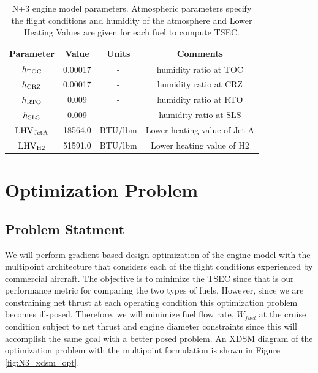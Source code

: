 \documentclass[conf]{new-aiaa}
\begin{document}
\begin{table}[hbt!]
    \centering
    \caption{
        N+3 engine model parameters.
        Atmospheric parameters specify the flight conditions and humidity of the atmosphere and Lower Heating Values are given for each fuel to compute TSEC.}
    \begin{tabular}{c c c c}
        \hline
        Parameter              & Value   & Units          & Comments                                        \\
        \hline
        $h_{\rm{TOC}}$         & 0.00017 & -              & humidity ratio at TOC \cite{Kalnay1996}         \\
        $h_{\rm{CRZ}}$         & 0.00017 & -              & humidity ratio at CRZ \cite{Kalnay1996}         \\
        $h_{\rm{RTO}}$         & 0.009   & -              & humidity ratio at RTO \cite{Kalnay1996}         \\
        $h_{\rm{SLS}}$         & 0.009   & -              & humidity ratio at SLS \cite{Kalnay1996}         \\
        $\rm{LHV}_{\rm{JetA}}$ & 18564.0 & \unit{BTU/lbm} & Lower heating value of Jet-A \cite{Lawicki2002} \\
        $\rm{LHV}_{\rm{H2}}$   & 51591.0 & \unit{BTU/lbm} & Lower heating value of H2 \cite{toolbox2003}    \\
        \hline
    \end{tabular}
    \label{engine_params}
\end{table}

\section{Optimization Problem}
\label{sec:optprob}

\subsection{Problem Statment}
We will perform gradient-based design optimization of the engine model with the multipoint architecture that considers each of the flight conditions experienced by commercial aircraft.
The objective is to minimize the TSEC since that is our performance metric for comparing the two types of fuels.
However, since we are constraining net thrust at each operating condition this optimization problem becomes ill-posed.
Therefore, we will minimize fuel flow rate, $W_{fuel}$ at the cruise condition subject to net thrust and engine diameter constraints since this will accomplish the same goal with a better posed problem.
An XDSM diagram of the optimization problem with the multipoint formulation is shown in Figure \ref{fig:N3_xdsm_opt}.
\end{document}
